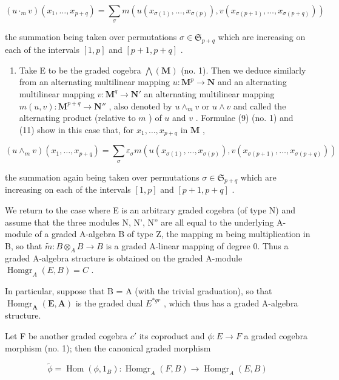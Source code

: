 \[
(u \cdot_{m} v) (x _ {1}, \dots , x _ {p + q}) = \sum_ {\sigma} m (u (x _ {\sigma (1)}, \dots , x _ {\sigma (p)}), v (x _ {\sigma (p + 1)}, \dots , x _ {\sigma (p + q)}))
\]

the summation being taken over permutations \(\sigma\in\mathfrak{S}_{p+q}\) which are increasing on each of the intervals \([1,p]\) and \([p+1,p+q]\) .

\begin{enumerate}
\def\labelenumi{(\arabic{enumi})}
\setcounter{enumi}{2}
\tightlist
\item
  Take E to be the graded cogebra \(\bigwedge (\mathbf{M})\) (no. 1). Then we deduce similarly from an alternating multilinear mapping \(u: \mathbf{M}^p \to \mathbf{N}\) and an alternating multilinear mapping \(v: \mathbf{M}^q \to \mathbf{N}'\) an alternating multilinear mapping \(m(u, v): \mathbf{M}^{p + q} \to \mathbf{N}''\) , also denoted by \(u \wedge_m v\) or \(u \wedge v\) and called the alternating product (relative to \(m\) ) of \(u\) and \(v\) . Formulae (9) (no. 1) and (11) show in this case that, for \(x_1, \ldots, x_{p + q}\) in \(\mathbf{M}\) ,
\end{enumerate}

\[
(u \wedge_ {m} v) (x _ {1}, \dots , x _ {p + q}) = \sum_ {\sigma} \varepsilon_ {\sigma} m (u (x _ {\sigma (1)}, \dots , x _ {\sigma (p)}), v (x _ {\sigma (p + 1)}, \dots , x _ {\sigma (p + q)}))
\]

the summation again being taken over permutations \(\sigma \in \mathfrak{S}_{p + q}\) which are increasing on each of the intervals \([1, p]\) and \([p + 1, p + q]\) .

We return to the case where E is an arbitrary graded cogebra (of type N) and assume that the three modules N, N', N'' are all equal to the underlying A-module of a graded A-algebra B of type Z, the mapping m being multiplication in B, so that \(\tilde{m}:B\otimes_{A}B\to B\) is a graded A-linear mapping of degree 0. Thus a graded A-algebra structure is obtained on the graded A-module \(\operatorname{Homgr}_{A}(E,B)=C\) .

In particular, suppose that B = A (with the trivial graduation), so that \(\operatorname{Homgr}_{\mathbf{A}}(\mathbf{E}, \mathbf{A})\) is the graded dual \(E^{*gr}\) , which thus has a graded A-algebra structure.

Let F be another graded cogebra \(c'\) its coproduct and \(\phi:E\to F\) a graded cogebra morphism (no. 1); then the canonical graded morphism

\[
\tilde {\phi} = \operatorname{Hom} (\phi , 1 _ {B}): \operatorname{Homgr} _ {A} (F, B) \rightarrow \operatorname{Homgr} _ {A} (E, B)
\]


